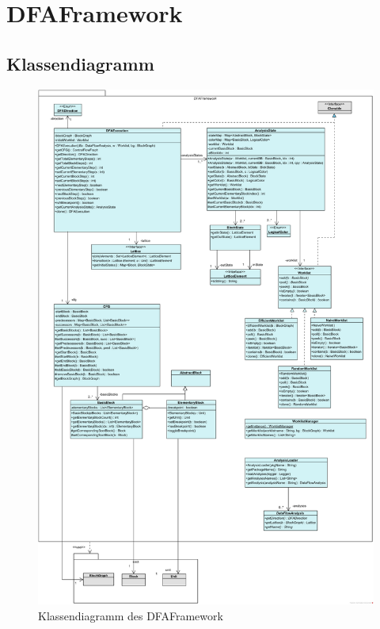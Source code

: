 
\section{DFAFramework}

\subsection{Klassendiagramm}
\begin{figure}[htbp] 
	\centering
	\includegraphics[width=1\textwidth]{Klassenuebersicht/DFAFramework/DFAFramework}
	\caption{Klassendiagramm des DFAFramework}
	\label{fig:DFAFreamework}
\end{figure}

